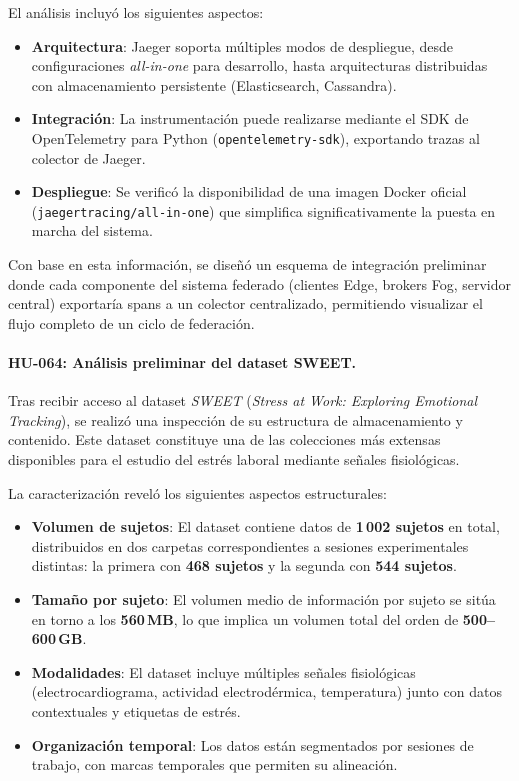 \documentclass{report}
\begin{document}
El análisis incluyó los siguientes aspectos:
\begin{itemize}
    \item \textbf{Arquitectura}: Jaeger soporta múltiples modos de despliegue, desde configuraciones \textit{all-in-one} para desarrollo, hasta arquitecturas distribuidas con almacenamiento persistente (Elasticsearch, Cassandra).
    \item \textbf{Integración}: La instrumentación puede realizarse mediante el SDK de OpenTelemetry para Python (\texttt{opentelemetry-sdk}), exportando trazas al colector de Jaeger.
    \item \textbf{Despliegue}: Se verificó la disponibilidad de una imagen Docker oficial (\texttt{jaegertracing/all-in-one}) que simplifica significativamente la puesta en marcha del sistema.
\end{itemize}

Con base en esta información, se diseñó  un esquema de integración preliminar donde cada componente del sistema federado (clientes Edge, brokers Fog, servidor central) exportaría spans a un colector centralizado, permitiendo visualizar el flujo completo de un ciclo de federación. 
\vspace{0.15em}
\paragraph{HU-064: Análisis preliminar del dataset SWEET.}

Tras recibir acceso al dataset \textit{SWEET} (\textit{Stress at Work: Exploring Emotional Tracking}), se realizó una inspección de su estructura de almacenamiento y contenido. Este dataset constituye una de las colecciones más extensas disponibles para el estudio del estrés laboral mediante señales fisiológicas.

La caracterización reveló los siguientes aspectos estructurales:
\begin{itemize}
    \item \textbf{Volumen de sujetos}: El dataset contiene datos de \textbf{1\,002 sujetos} en total, distribuidos en dos carpetas correspondientes a sesiones experimentales distintas: la primera con \textbf{468 sujetos} y la segunda con \textbf{544 sujetos}.
    \item \textbf{Tamaño por sujeto}: El volumen medio de información por sujeto se sitúa en torno a los \textbf{560\,MB}, lo que implica un volumen total del orden de \textbf{500--600\,GB}.
    \item \textbf{Modalidades}: El dataset incluye múltiples señales fisiológicas (electrocardiograma, actividad electrodérmica, temperatura) junto con datos contextuales y etiquetas de estrés.
    \item \textbf{Organización temporal}: Los datos están segmentados por sesiones de trabajo, con marcas temporales que permiten su alineación.
\end{itemize}
\end{document}

